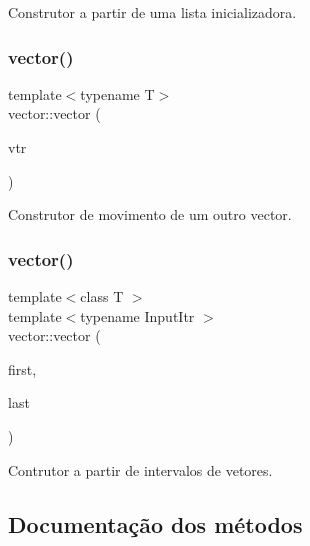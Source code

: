 Construtor a partir de uma lista inicializadora. 

\mbox{\label{classsc_1_1vector_a63a0f6f3a31120e3e3f269553d0fa82d}} 
\subsubsection{\texorpdfstring{vector()}{vector()}\hspace{0.1cm}{\footnotesize\ttfamily [4/5]}}
{\footnotesize\ttfamily template$<$typename T$>$ \\
vector\+::vector (\begin{DoxyParamCaption}\item[{\hyperlink{classsc_1_1vector}{vector}$<$ T $>$ \&\&}]{vtr }\end{DoxyParamCaption})}



Construtor de movimento de um outro vector. 

\mbox{\label{classsc_1_1vector_af271ce749db30ebfaf317330e5b1de8c}} 
\subsubsection{\texorpdfstring{vector()}{vector()}\hspace{0.1cm}{\footnotesize\ttfamily [5/5]}}
{\footnotesize\ttfamily template$<$class T $>$ \\
template$<$typename Input\+Itr $>$ \\
vector\+::vector (\begin{DoxyParamCaption}\item[{Input\+Itr}]{first,  }\item[{Input\+Itr}]{last }\end{DoxyParamCaption})}



Contrutor a partir de intervalos de vetores. 



\subsection{Documentação dos métodos}
\mbox{\label{classsc_1_1vector_a6295cd66e564a954bc384fc016dc80a0}} 
